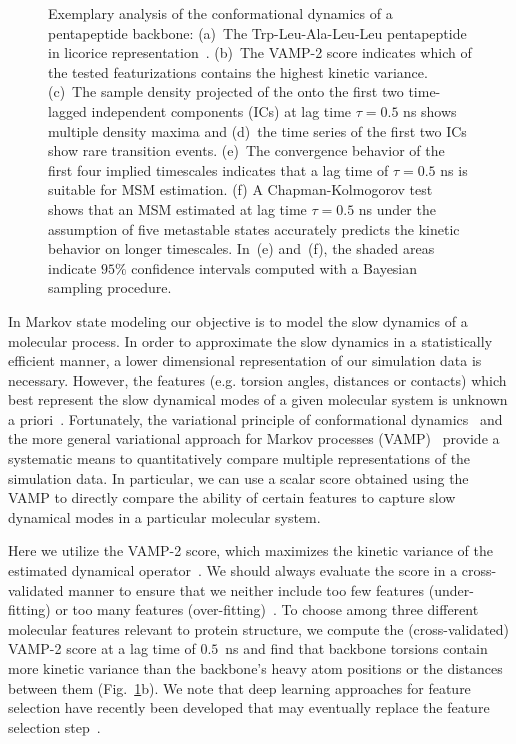 \documentclass[9pt,tutorial]{livecoms}
\begin{document}
\begin{figure}
\caption{Exemplary analysis of the conformational dynamics of a pentapeptide backbone: (a)~The Trp-Leu-Ala-Leu-Leu pentapeptide in licorice representation~\cite{vmd}.
(b)~The VAMP-2 score indicates which of the tested featurizations contains the highest kinetic variance.
(c)~The  sample density projected of the onto the first two time-lagged independent components (ICs) at lag time $\tau=0.5$ ns shows multiple density maxima and
(d)~the time series of the first two ICs show rare transition events.
(e)~The convergence behavior of the first four implied timescales indicates that a lag time of $\tau=0.5$ ns is suitable for MSM estimation.
(f) A Chapman-Kolmogorov test shows that an MSM estimated at lag time $\tau=0.5$ ns under the assumption of five metastable states accurately predicts the kinetic behavior on longer timescales.
In~(e) and~(f), the shaded areas indicate $95\%$ confidence intervals computed with a Bayesian sampling procedure.}
\label{fig:io-to-ck}
\end{figure}

In Markov state modeling our objective is to model the slow dynamics of a molecular process. In order to approximate the slow dynamics in a statistically efficient manner, a lower dimensional representation of our simulation data is necessary.
However, the features (e.g. torsion angles, distances or contacts) which best represent the slow dynamical modes of a given molecular system is unknown a priori~\cite{NoeClementiReview}.
Fortunately, the variational principle of conformational dynamics~\cite{noe-vac,nueske-vamk} and the more general variational approach for Markov processes (VAMP)~\cite{vamp-preprint} provide a systematic means to quantitatively compare multiple representations of the simulation data.
In particular, we can use a scalar score obtained using the VAMP to directly compare the ability of certain features to capture slow dynamical modes in a particular molecular system.

Here we utilize the VAMP-2 score, which maximizes the kinetic variance of the estimated dynamical operator~\cite{kinetic-maps}.
We should always evaluate the score in a cross-validated manner to ensure that we neither include too few features (under-fitting) or too many features (over-fitting)~\cite{gmrq,vamp-preprint}.
To choose among three different molecular features relevant to protein structure, we compute the (cross-validated) VAMP-2 score at a lag time of $0.5$~ns and find that backbone torsions contain more kinetic variance than the backbone's heavy atom positions or the distances between them (Fig.~\ref{fig:io-to-ck}b).
We note that deep learning approaches for feature selection have recently been developed that may eventually replace the feature selection step~\cite{vampnet,tae,hernandez-vde}.
\end{document}
